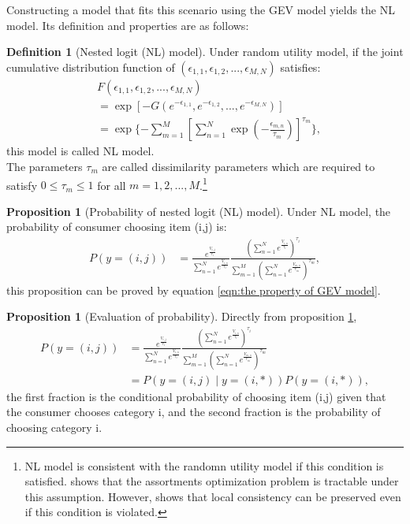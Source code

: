 \documentclass[12pt]{article}
\theoremstyle{definition}
\newtheorem{definition}{Definition}[section]
\newtheorem{prop}[theorem]{Proposition}
\begin{document}
\begin{sloppypar}
Constructing a model that fits this scenario using the GEV model yields the NL model. Its definition and properties are as follows:
\begin{definition}[Nested logit (NL) model]
    Under random utility model, if the joint cumulative distribution function of $(\epsilon_{1,1}, \epsilon_{1,2}, ..., \epsilon_{M,N})$ satisfies:
    \begin{align*}
        &F(\epsilon_{1,1}, \epsilon_{1,2}, ..., \epsilon_{M,N})\\
        &=\exp[-G(e^{-\epsilon_{1,1}}, e^{-\epsilon_{1,2}}, ..., e^{-\epsilon_{M,N}})]\\
        &=\exp\{-\sum_{m=1}^{M}[\sum_{n=1}^{N}\exp(-\frac{\epsilon_{m,n}}{\tau_m})]^{\tau_m}\},
    \end{align*}
    this model is called NL model. \\
    The parameters $\tau_m$ are called dissimilarity parameters which are required to satisfy $0 \leq \tau_m \leq 1$ for all $m=1,2,...,M$.\footnote{NL model is consistent with the randomn utility model if this condition is satisfied. \textcite{davis2014} shows that the assortments optimization problem is tractable under this assumption. However, \textcite{borsch1990} shows that local consistency can be preserved even if this condition is violated. }
\end{definition}

\begin{prop}[Probability of nested logit (NL) model]\label{prop:1}
    Under NL model, the probability of consumer choosing item (i,j) is:
    \begin{align*}
        P(y=(i,j)) &= \frac{e^\frac{{V_{i,j}}}{\tau_i}}{\sum_{n=1}^{N} e^\frac{{V_{i,n}}}{\tau_i}} \frac{(\sum_{n=1}^{N} e^\frac{{V_{i,n}}}{\tau_i})^{\tau_i}}{\sum_{m=1}^{M}(\sum_{n=1}^{N} e^\frac{{V_{m,n}}}{\tau_m})^{\tau_m}},
    \end{align*}
    this proposition can be proved by equation \ref{eqn:the property of GEV model}.
\end{prop}

\begin{prop}[Evaluation of probability]\label{prop:2}
    Directly from proposition \ref{prop:1}, 
    \begin{align*}
        P(y=(i,j)) 
        &= \frac{e^\frac{{V_{i,j}}}{\tau_i}}{\sum_{n=1}^{N} e^\frac{{V_{i,n}}}{\tau_i}} \frac{(\sum_{n=1}^{N} e^\frac{{V_{i,n}}}{\tau_i})^{\tau_i}}{\sum_{m=1}^{M}(\sum_{n=1}^{N} e^\frac{{V_{m,n}}}{\tau_m})^{\tau_m}}\\
        &= P(y=(i,j) \mid y=(i,*))P(y=(i,*)),
    \end{align*}
    the first fraction is the conditional probability of choosing item (i,j) given that the consumer chooses category i, and the second fraction is the probability of choosing category i.
\end{prop}


\end{sloppypar}
\end{document}

